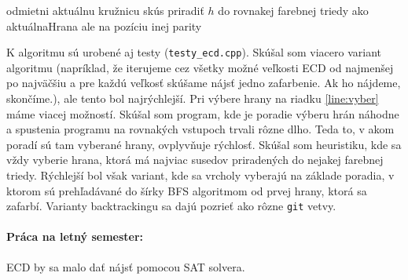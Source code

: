 \documentclass[11pt]{article}
\begin{document}
\begin{algorithmic}[1]
        \State odmietni aktuálnu kružnicu
        \State \Return
        \State {} 
        \State \Return
        \Else
            \State skús priradiť $h$ do rovnakej farebnej triedy ako aktuálnaHrana ale na pozíciu inej parity
        \EndFor
        \EndIf
        
    \EndFunction
\end{algorithmic}

K algoritmu sú urobené aj testy (\texttt{testy\_ecd.cpp}). Skúšal som viacero variant algoritmu (napríklad, že 
iterujeme cez všetky možné veľkosti ECD od najmenšej po najväčšiu a pre každú veľkosť skúšame nájsť jedno zafarbenie.
Ak ho nájdeme, skončíme.), ale tento bol najrýchlejší. Pri výbere hrany na riadku \ref{line:vyber}
máme viacej možností. Skúšal som program, kde je poradie výberu hrán náhodne a spustenia
programu na rovnakých vstupoch trvali rôzne dlho. Teda to, v akom poradí sú tam vyberané 
hrany, ovplyvňuje rýchlosť. Skúšal som heuristiku, kde sa vždy vyberie hrana, ktorá má najviac
susedov priradených do nejakej farebnej triedy. Rýchlejší bol však variant, kde sa vrcholy vyberajú
na základe poradia, v ktorom sú prehľadávané do šírky BFS algoritmom od prvej hrany, ktorá sa zafarbí.
Varianty backtrackingu sa dajú pozrieť ako rôzne \texttt{git} vetvy. 

\paragraph{Práca na letný semester:} ECD by sa malo dať nájsť pomocou SAT solvera.
\printbibliography
\end{document}
